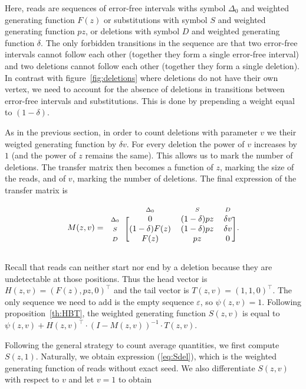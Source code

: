 \documentclass{article}
\newcommand{\smD}{\scriptstyle{D}}
\newcommand{\smS}{\scriptstyle{S}}
\newcommand{\smDELz}{\scriptstyle{\Delta_0}}
\begin{document}
Here, reads are sequences of error-free intervals withs symbol $\Delta_0$
and weighted generating function $F(z)$ or substitutions with symbol $S$
and weighted generating function $pz$, or deletions with symbol $D$ and
weighted generating function $\delta$. The only forbidden transitions in
the sequence are that two error-free intervals cannot follow each other
(together they form a single error-free interval) and two deletions cannot
follow each other (together they form a single deletion). In contrast with
figure~\ref{fig:deletions} where deletions do not have their own vertex,
we need to account for the absence of deletions in transitions between
error-free intervals and substitutions. This is done by prepending a
weight equal to $(1-\delta)$.

As in the previous section, in order to count deletions with parameter $v$
we their weigted generating function by $\delta v$. For every deletion the
power of $v$ increases by $1$ (and the power of $z$ remains the same).
This allows us to mark the number of deletions. The transfer matrix then
becomes a function of $z$, marking the size of the reads, and of $v$,
marking the number of deletions. The final expression of the transfer
matrix is



\begin{equation*}
M(z,v) = 
\begin{blockarray}{cccc}
       & \smDELz & \smS & \smD \\
\begin{block}{c[ccc]}
\smDELz & 0              & (1-\delta)pz & \delta v \\
\smS    & (1-\delta)F(z) & (1-\delta)pz & \delta v \\
\smD    & F(z)           & pz           & 0        \\
\end{block}
\end{blockarray}.
\end{equation*}

Recall that reads can neither start nor end by a deletion because they are
undetectable at those positions. Thus the head vector is $H(z,v) = (F(z),
pz, 0)^\top$ and the tail vector is $T(z,v) = (1,1,0)^\top$. The only
sequence we need to add is the empty sequence $\varepsilon$, so $\psi(z,v)
= 1$. Following proposition~\ref{th:HBT}, the weighted generating function
$S(z,v)$ is equal to $\psi(z,v) + H(z,v)^\top \cdot (I-M(z,v))^{-1} \cdot
T(z,v)$.

Following the general strategy to count average quantities, we first
compute $S(z,1)$. Naturally, we obtain expression (\ref{eq:Sdel}), which
is the weighted generating function of reads without exact seed. We also
differentiate $S(z,v)$ with respect to $v$ and let $v=1$ to obtain
\end{document}
